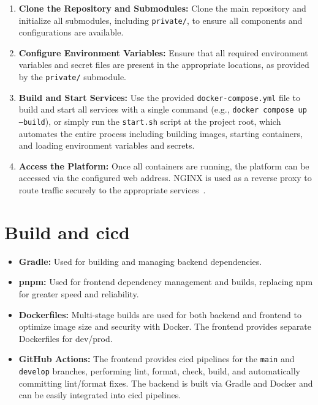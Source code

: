 \begin{enumerate}
    \item \textbf{Clone the Repository and Submodules:} Clone the main repository and initialize all submodules, including \texttt{private/}, to ensure all components and configurations are available.
    \item \textbf{Configure Environment Variables:} Ensure that all required environment variables and secret files are present in the appropriate locations, as provided by the \texttt{private/} submodule.
    \item \textbf{Build and Start Services:} Use the provided \texttt{docker-compose.yml} file to build and start all services with a single command (e.g., \texttt{docker compose up --build}), or simply run the \texttt{start.sh} script at the project root, which automates the entire process including building images, starting containers, and loading environment variables and secrets.
    \item \textbf{Access the Platform:} Once all containers are running, the platform can be accessed via the configured web address. NGINX is used as a reverse proxy to route traffic securely to the appropriate services~\cite{nginx-docs}.
\end{enumerate}

\section{Build and \acf{cicd}} \label{sec:build_cicd}

\begin{itemize}
    \item \textbf{Gradle:} Used for building and managing backend dependencies.
    \item \textbf{pnpm:} Used for frontend dependency management and builds, replacing npm for greater speed and reliability.
    \item \textbf{Dockerfiles:} Multi-stage builds are used for both backend and frontend to optimize image size and security with Docker. The frontend provides separate Dockerfiles for dev/prod.
    \item \textbf{GitHub Actions:} The frontend provides \ac{cicd} pipelines for the \texttt{main} and \texttt{develop} branches, performing lint, format, check, build, and automatically committing lint/format fixes. The backend is built via Gradle and Docker and can be easily integrated into \ac{cicd} pipelines.
\end{itemize}

